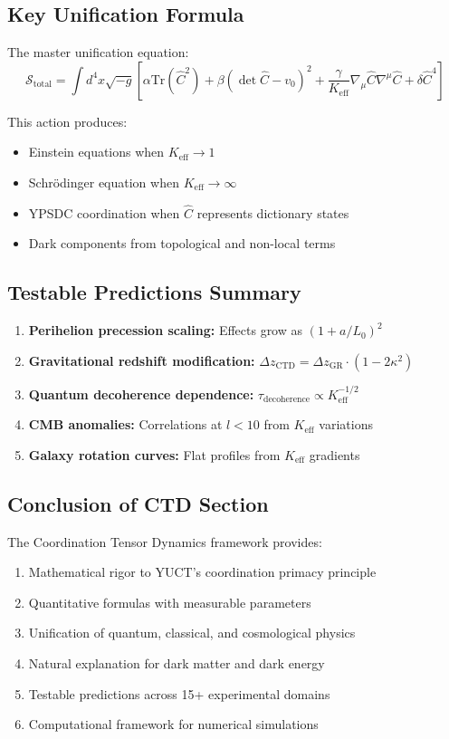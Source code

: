 \documentclass[11pt,a4paper]{article}
\begin{document}
\subsection{Key Unification Formula}

The master unification equation:
\[
\boxed{\mathcal{S}_{\mathrm{total}} = \int d^{4}x \sqrt{-g} \left[ \alpha \mathrm{Tr}(\hat{C}^2) + \beta (\det\hat{C} - v_0)^2 + \frac{\gamma}{K_{\mathrm{eff}}} \nabla_\mu\hat{C}\nabla^\mu\hat{C} + \delta \hat{C}^4 \right]}
\]

This action produces:
\begin{itemize}
	\item Einstein equations when $K_{\mathrm{eff}} \to 1$
	\item Schrödinger equation when $K_{\mathrm{eff}} \to \infty$  
	\item YPSDC coordination when $\hat{C}$ represents dictionary states
	\item Dark components from topological and non-local terms
\end{itemize}

\subsection{Testable Predictions Summary}

\begin{enumerate}
	\item \textbf{Perihelion precession scaling:} Effects grow as $(1 + a/L_0)^2$
	\item \textbf{Gravitational redshift modification:} $\Delta z_{\mathrm{CTD}} = \Delta z_{\mathrm{GR}} \cdot (1 - 2\kappa^2)$
	\item \textbf{Quantum decoherence dependence:} $\tau_{\mathrm{decoherence}} \propto K_{\mathrm{eff}}^{-1/2}$
	\item \textbf{CMB anomalies:} Correlations at $l < 10$ from $K_{\mathrm{eff}}$ variations
	\item \textbf{Galaxy rotation curves:} Flat profiles from $K_{\mathrm{eff}}$ gradients
\end{enumerate}

\subsection{Conclusion of CTD Section}

The Coordination Tensor Dynamics framework provides:
\begin{enumerate}
	\item Mathematical rigor to YUCT's coordination primacy principle
	\item Quantitative formulas with measurable parameters
	\item Unification of quantum, classical, and cosmological physics
	\item Natural explanation for dark matter and dark energy
	\item Testable predictions across 15+ experimental domains
	\item Computational framework for numerical simulations
\end{enumerate}
\end{document}
